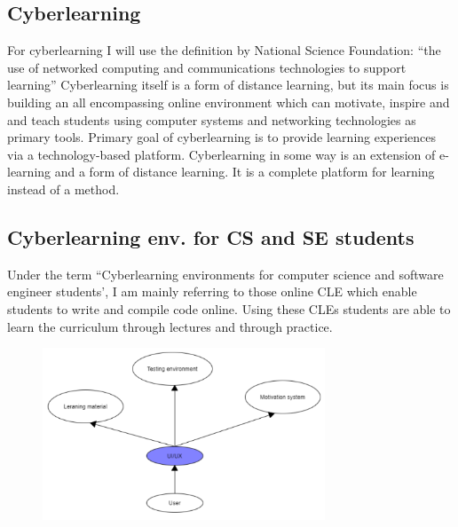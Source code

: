 \documentclass[10pt,twoside,english,a4paper]{article}
\begin{document}
\subsection{Cyberlearning}
For cyberlearning I will use the definition by National Science Foundation: 
``the use of networked computing and communications technologies to support learning” \cite{borgman_2017_fostering} 
Cyberlearning itself is a form of distance learning, but its main focus is building an all 
encompassing online environment which can motivate, inspire and and teach students using 
computer systems and networking technologies as primary tools. \cite{ui/ux}
Primary goal of cyberlearning is to provide learning experiences via a technology-based platform. 
Cyberlearning in some way is an extension of e-learning and a form of distance learning.\cite{ui/ux}
It is a complete platform for learning instead of a method. 

\subsection{Cyberlearning env. for CS and SE students}
Under the term ``Cyberlearning environments for computer science and software engineer students', I am mainly
referring to those online CLE which enable students to write and compile code online. Using these CLEs 
students are able to learn the curriculum through lectures and through practice.







\begin{figure}
\includegraphics[width=0.75\textwidth]{images/diagram-crop.pdf}
\end{figure}
\end{document}
